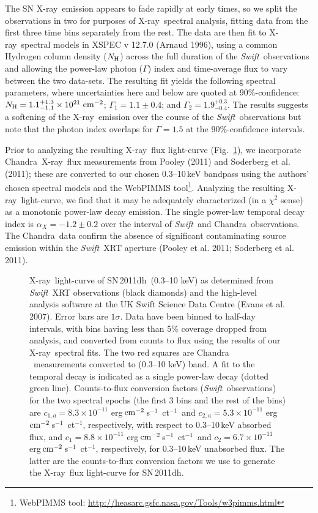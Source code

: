 \documentclass{emulateapj}
\newcommand{\sn}{\mbox{SN\,2011dh}}
\newcommand{\xray}{\mbox{X-ray}}
\newcommand{\swift}{\mbox{\it Swift}}
\def\nh{\mbox{$N_{\rm H}$}}
\newcommand{\chandra}{\mbox{Chandra}}
\newcommand{\erg}{\mbox{erg}}
\newcommand{\persec}{\mbox{s$^{-1}$}}
\newcommand{\percmsq}{${\rm cm}^{-2}$}
\newcommand{\cgsflux}{\erg\,\percmsq\,\persec}
\newcommand{\perct}{\mbox{ct$^{-1}$}}
\begin{document}
The SN \xray\ emission appears to fade rapidly at early times, so we
split the observations in two for purposes of \xray\ spectral
analysis, fitting data from the first three time bins separately from
the rest. The data are then fit to
\xray\ spectral models in XSPEC v 12.7.0 (Arnaud 1996), using a common Hydrogen
column density ($\nh$) across the full duration of the \swift\ observations and
allowing the power-law photon ($\Gamma$) index and time-average flux to vary
between the two data-sets. The resulting fit yields the following
spectral parameters, where uncertainties here and below are quoted at
90\%-confidence: $\nh = 1.1^{+1.3}_{-1.1}\times
10^{21}$\,\percmsq; $\Gamma_1 = 1.1\pm
0.4$; and $\Gamma_2 = 1.9^{+0.3}_{-0.4}$. The
results suggests a softening of the \xray\ emission over the course
of the \swift\ observations but note that the photon index overlaps for $\Gamma=1.5$ at the 90\%-confidence intervals.

Prior to analyzing the resulting \xray\ flux light-curve
(Fig.~\ref{fig:snxray}), we incorporate \chandra\ \xray\ flux
measurements from Pooley (2011) and Soderberg et al. (2011); these are
converted to our chosen 0.3--10\,keV bandpass using the authors'
chosen spectral models and the WebPIMMS tool\footnote{WebPIMMS tool:
  \url{http://heasarc.gsfc.nasa.gov/Tools/w3pimms.html}}.
Analyzing the resulting \xray\ light-curve, we find that
it may be adequately characterized (in a $\chi^2$ sense) as a
monotonic power-law decay emission. The single power-law
temporal decay index is $\alpha_{X} = -1.2\pm 0.2$ over the interval
  of \swift\ and \chandra\ observations. The \chandra\ data confirm the
  absence of significant contaminating source emission within the
  \swift\ XRT aperture (Pooley et al. 2011; Soderberg et al. 2011).



\begin{figure}
\caption[]{\small \xray\ light-curve of \sn\ (0.3--10 keV) as determined from
  \swift\ XRT observations (black diamonds) and the high-level analysis software at the
  UK Swift Science Data Centre (Evans et al. 2007). Error bars are $1\sigma$. Data have been binned
  to half-day intervals, with bins having less than 5\% coverage
  dropped from analysis, and converted from counts to flux using the
  results of our \xray\ spectral fits. The two red squares are \chandra
  ~measurements converted to (0.3--10 keV) band. A fit to the temporal decay
  is indicated as a single power-law decay (dotted green
  line). Counts-to-flux conversion factors (\swift ~observations) for
  the two spectral epochs (the first 3 bins and the rest of the
  bins) are $c_{1,a} =
8.3\times 10^{-11}$ \cgsflux\ \perct\ and $c_{2,a} = 5.3\times 10^{-11}$ \cgsflux\ \perct, respectively, with respect to 0.3--10\,keV
absorbed flux, and $c_1 = 8.8\times 10^{-11}$ \cgsflux\ \perct\ and
$c_2 = 6.7\times 10^{-11}$ \cgsflux\ \perct, respectively, for
0.3--10\,keV unabsorbed flux.  The latter are the counts-to-flux
conversion factors we use to generate the \xray\ flux light-curve for
\sn.}
\label{fig:snxray}
\end{figure}
\end{document}
